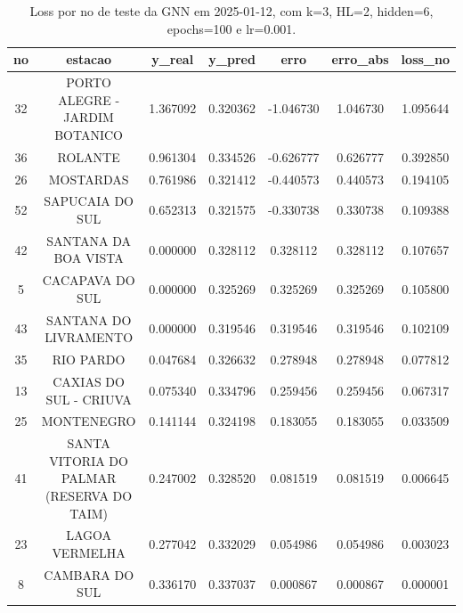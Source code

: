 \begin{table}[h]
\centering
\caption{Loss por no de teste da GNN em 2025-01-12, com k=3, HL=2, hidden=6, epochs=100 e lr=0.001.}
\label{tab:gnn_loss_k3_hl2_h6_e100_d20250112}
\begin{tabular}{ccccccc}
\toprule
no & estacao & y\_real & y\_pred & erro & erro\_abs & loss\_no \\
\midrule
32 & PORTO ALEGRE - JARDIM BOTANICO & 1.367092 & 0.320362 & -1.046730 & 1.046730 & 1.095644 \\
36 & ROLANTE & 0.961304 & 0.334526 & -0.626777 & 0.626777 & 0.392850 \\
26 & MOSTARDAS & 0.761986 & 0.321412 & -0.440573 & 0.440573 & 0.194105 \\
52 & SAPUCAIA DO SUL & 0.652313 & 0.321575 & -0.330738 & 0.330738 & 0.109388 \\
42 & SANTANA DA BOA VISTA & 0.000000 & 0.328112 & 0.328112 & 0.328112 & 0.107657 \\
5 & CACAPAVA DO SUL & 0.000000 & 0.325269 & 0.325269 & 0.325269 & 0.105800 \\
43 & SANTANA DO LIVRAMENTO & 0.000000 & 0.319546 & 0.319546 & 0.319546 & 0.102109 \\
35 & RIO PARDO & 0.047684 & 0.326632 & 0.278948 & 0.278948 & 0.077812 \\
13 & CAXIAS DO SUL - CRIUVA & 0.075340 & 0.334796 & 0.259456 & 0.259456 & 0.067317 \\
25 & MONTENEGRO & 0.141144 & 0.324198 & 0.183055 & 0.183055 & 0.033509 \\
41 & SANTA VITORIA DO PALMAR (RESERVA DO TAIM) & 0.247002 & 0.328520 & 0.081519 & 0.081519 & 0.006645 \\
23 & LAGOA VERMELHA & 0.277042 & 0.332029 & 0.054986 & 0.054986 & 0.003023 \\
8 & CAMBARA DO SUL & 0.336170 & 0.337037 & 0.000867 & 0.000867 & 0.000001 \\
\bottomrule
\end{tabular}
\end{table}
